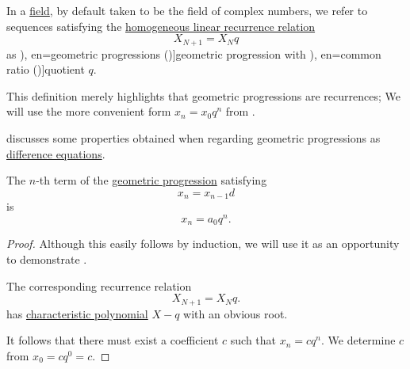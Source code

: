 \begin{definition}\label{def:geometric_progression}\mimprovised
  In a \hyperref[def:field]{field}, by default taken to be the field of complex numbers, we refer to sequences satisfying the \hyperref[def:homogeneous_linear_recurrence]{homogeneous linear recurrence relation}
  \begin{equation}\label{eq:def:geometric_progression/recurrence}
    X_{N+1} = X_N q
  \end{equation}
  as \term[ru=геометрическае прогрессии (\cite[144]{АлександровМаркушевичХинчинИПр1952ЭнциклопедияТом3}), en=geometric progressions (\cite[def. 2.4.2]{Rosen2019DiscreteMathematics})]{geometric progression} with \term[ru=знаменатель (прогрессии) (\cite[\S 227]{Киселёв2004Геометрия}), en=common ratio (\cite[def. 2.4.2]{Rosen2019DiscreteMathematics})]{quotient} \( q \).
\end{definition}
\begin{comments}
  \item This definition merely highlights that geometric progressions are recurrences; We will use the more convenient form \( x_n = x_0 q^n \) from .

  \item {} discusses some properties obtained when regarding geometric progressions as \hyperref[def:difference_equation]{difference equations}.
\end{comments}

\begin{proposition}\label{thm:geometric_progression_unwinding}
  The \( n \)-th term of the \hyperref[def:arithmetic_progression]{geometric progression} satisfying
  \begin{equation*}
    x_n = x_{n-1} d
  \end{equation*}
  is
  \begin{equation*}
    x_n = a_0 q^n.
  \end{equation*}
\end{proposition}
\begin{proof}
  Although this easily follows by induction, we will use it as an opportunity to demonstrate .

  The corresponding recurrence relation
  \begin{equation*}
    X_{N+1} = X_N q.
  \end{equation*}
  has \hyperref[def:linear_recurrence_characteristic_polynomial]{characteristic polynomial} \( X - q \) with an obvious root.

  It follows that there must exist a coefficient \( c \) such that \( x_n = cq^n \). We determine \( c \) from \( x_0 = c q^0 = c \).
\end{proof}

